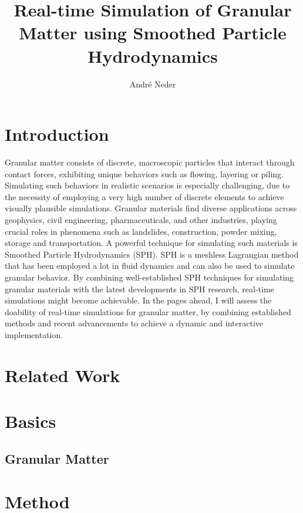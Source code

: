 \documentclass[intern]{cgMA}
\title{Real-time Simulation of Granular Matter using Smoothed Particle Hydrodynamics}
\author{André Neder}
\begin{document}
    \maketitle
    \newpage
    \tableofcontents
    \newpage
    \section{Introduction}

    Granular matter consists of discrete, macroscopic particles that interact through contact forces, exhibiting unique behaviors such as flowing, layering or piling. Simulating such behaviors in realistic scenarios is especially challenging, due to the necessity of employing a very high number of discrete elements to achieve visually plausible simulations. Granular materials find diverse applications across geophysics, civil engineering, pharmaceuticals, and other industries, playing crucial roles in phenomena such as landslides, construction, powder mixing, storage and transportation. A powerful technique for simulating such materials is Smoothed Particle Hydrodynamics (SPH). SPH is a meshless Lagrangian method that has been employed a lot in fluid dynamics and can also be used to simulate granular behavior. By combining well-established SPH techniques for simulating granular materials with the latest developments in SPH research, real-time simulations might become achievable. In the pages ahead, I will assess the doability of real-time simulations for granular matter, by combining established methods and recent advancements to achieve a dynamic and interactive implementation.

    \section{Related Work}
    
    \section{Basics}
    \subsection{Granular Matter}
    
    \section{Method}
\end{document}

